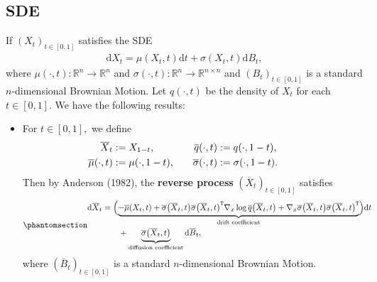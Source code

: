 \documentclass[
]{article}
\theoremstyle{remark}
\begin{document}
\subsection{SDE}\label{sde}

If \((X_t)_{t\in [0,1]}\) satisfies the SDE \[
\begin{aligned}
  \mathrm{d} X_t = \mu(X_t,t) \mathrm{d}t + \sigma(X_t,t) \mathrm{d}B_t,
\end{aligned}
\] where \(\mu(\cdot ,t):\mathbb R^n\longrightarrow \mathbb R^n\) and
\(\sigma(\cdot ,t): \mathbb R^n \longrightarrow \mathbb R^{n\times n}\)
and \((B_t)_{t\in [0,1]}\) is a standard \(n\)-dimensional Brownian
Motion. Let \(q(\cdot , t)\) be the density of \(X_t\) for each
\(t\in [0,1].\) We have the following results:

\begin{itemize}
\item
  For \(t\in [0,1],\) we define \[
  \begin{aligned}
    \overline{X}_t &:= X_{1-t}, \quad  &
    \overline{q}(\cdot , t) &:= q(\cdot , 1-t), \quad\cr 
    \overline{\mu}(\cdot , t) &:= \mu(\cdot , 1-t), \quad  &
    \overline{\sigma}(\cdot , t) &:= \sigma( \cdot , 1-t ).
  \end{aligned}
  \] Then by Anderson (1982), the \textbf{reverse process}
  \((\overline{X}_t)_{t\in [0,1]}\) satisfies
  \begin{equation}\phantomsection\label{eq-reverseSDE0}{
  \begin{aligned}
    \mathrm{d} \overline{X}_t 
    &= \Bigl( \underbrace{-\overline{\mu}(X_t,t) + 
      \overline{\sigma} \bigl( \overline{X}_t,t \bigr) \overline{\sigma} \bigl( \overline{X}_t,t \bigr)^{\mathtt{T}} \nabla_{x} \log \overline{q}\bigl( \overline{X}_t,t \bigr) 
      + \nabla_x  \overline{\sigma} \bigl( \overline{X}_t,t \bigr) \overline{\sigma} \bigl( \overline{X}_t,t \bigr)^{\mathtt{T}}}_{\text{drift coefficient}}
      \Bigr) \mathrm{d}t  \cr 
    & \qquad + \underbrace{\overline{\sigma}\bigl( \overline{X}_t,t \bigr)}_{\text{diffusion coefficient}} \mathrm{d}\overline{B}_t,
  \end{aligned}
  }\end{equation} where \((\overline{B}_t)_{t\in [0,1]}\) is a standard
  \(n\)-dimensional Brownian Motion.


\end{itemize}
\end{document}
